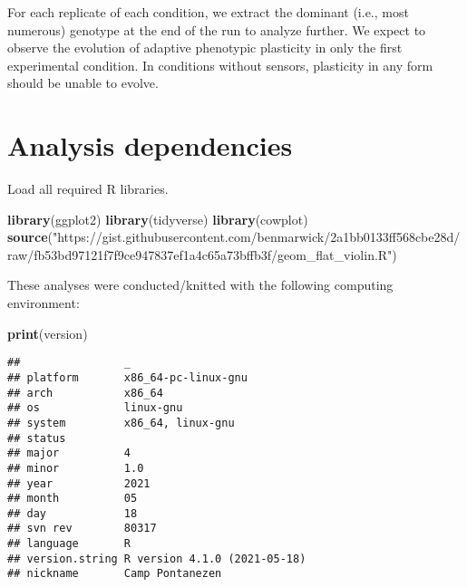 \documentclass[]{book}
\newenvironment{Shaded}{\begin{snugshade}}{\end{snugshade}}
\newcommand{\KeywordTok}[1]{\textcolor[rgb]{0.13,0.29,0.53}{\textbf{#1}}}
\newcommand{\NormalTok}[1]{#1}
\newcommand{\StringTok}[1]{\textcolor[rgb]{0.31,0.60,0.02}{#1}}
\begin{document}
For each replicate of each condition, we extract the dominant (i.e., most numerous) genotype at the end of the run to analyze further.
We expect to observe the evolution of adaptive phenotypic plasticity in only the first experimental condition.
In conditions without sensors, plasticity in any form should be unable to evolve.

\hypertarget{analysis-dependencies}{%
\section{Analysis dependencies}\label{analysis-dependencies}}

Load all required R libraries.

\begin{Shaded}
\begin{Highlighting}[]
\KeywordTok{library}\NormalTok{(ggplot2)}
\KeywordTok{library}\NormalTok{(tidyverse)}
\KeywordTok{library}\NormalTok{(cowplot)}
\KeywordTok{source}\NormalTok{(}\StringTok{"https://gist.githubusercontent.com/benmarwick/2a1bb0133ff568cbe28d/raw/fb53bd97121f7f9ce947837ef1a4c65a73bffb3f/geom_flat_violin.R"}\NormalTok{)}
\end{Highlighting}
\end{Shaded}

These analyses were conducted/knitted with the following computing environment:

\begin{Shaded}
\begin{Highlighting}[]
\KeywordTok{print}\NormalTok{(version)}
\end{Highlighting}
\end{Shaded}

\begin{verbatim}
##                _                           
## platform       x86_64-pc-linux-gnu         
## arch           x86_64                      
## os             linux-gnu                   
## system         x86_64, linux-gnu           
## status                                     
## major          4                           
## minor          1.0                         
## year           2021                        
## month          05                          
## day            18                          
## svn rev        80317                       
## language       R                           
## version.string R version 4.1.0 (2021-05-18)
## nickname       Camp Pontanezen
\end{verbatim}
\end{document}
